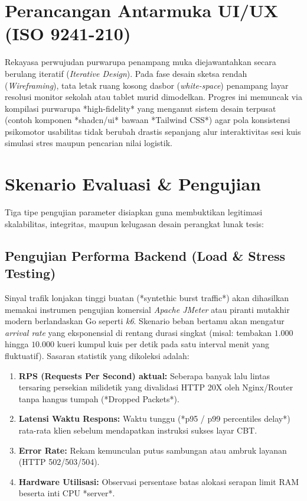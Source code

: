 \section{Perancangan Antarmuka UI/UX (ISO 9241-210)}

Rekayasa perwujudan purwarupa penampang muka diejawantahkan secara berulang iteratif (\textit{Iterative Design}). Pada fase desain sketsa rendah (\textit{Wireframing}), tata letak ruang kosong dasbor (\textit{white-space}) penampang layar resolusi monitor sekolah atau tablet murid dimodelkan. Progres ini memuncak via kompilasi purwarupa *high-fidelity* yang menganut sistem desain terpusat (contoh komponen *shadcn/ui* bawaan *Tailwind CSS*) agar pola konsistensi psikomotor usabilitas tidak berubah drastis sepanjang alur interaktivitas sesi kuis simulasi stres maupun pencarian nilai logistik.

\section{Skenario Evaluasi \& Pengujian}

Tiga tipe pengujian parameter disiapkan guna membuktikan legitimasi skalabilitas, integritas, maupun kelugasan desain perangkat lunak tesis:

\subsection{Pengujian Performa Backend (Load \& Stress Testing)}
Sinyal trafik lonjakan tinggi buatan (*syntethic burst traffic*) akan dihasilkan memakai instrumen pengujian komersial \textit{Apache JMeter} atau piranti mutakhir modern berlandaskan Go seperti \textit{k6}.
Skenario beban bertamu akan mengatur \textit{arrival rate} yang eksponensial di rentang durasi singkat (misal: tembakan $1.000$ hingga $10.000$ kueri kumpul kuis per detik pada satu interval menit yang fluktuatif).
Sasaran statistik yang dikoleksi adalah:
\begin{enumerate}
	\item \textbf{RPS (Requests Per Second) aktual:} Seberapa banyak lalu lintas tersaring persekian milidetik yang divalidasi HTTP 20X oleh Nginx/Router tanpa hangus tumpah (*Dropped Packets*).
	\item \textbf{Latensi Waktu Respons:} Waktu tunggu (*p95 / p99 percentiles delay*) rata-rata klien sebelum mendapatkan instruksi sukses layar CBT.
	\item \textbf{Error Rate:} Rekam kemunculan putus sambungan atau ambruk layanan (HTTP 502/503/504).
	\item \textbf{Hardware Utilisasi:} Observasi persentase batas alokasi serapan limit RAM beserta inti CPU *server*.
\end{enumerate}

